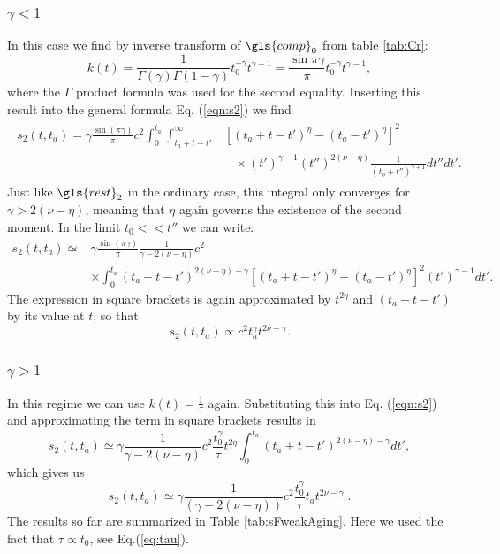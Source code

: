 \subsubsection{$\gamma<1$}
In this case we find by inverse transform of $\gls{comp}_0$ from table \ref{tab:Cr}:
\begin{equation}
 k(t) = \frac{1}{\Gamma(\gamma) \Gamma(1-\gamma)} t_0^{-\gamma} t^{\gamma-1} = \frac{\sin \pi \gamma}{\pi} t_0^{-\gamma} t^{\gamma-1} \label{eqn:kGammaSmall},
\end{equation}
%
where the $\Gamma$ product formula was used for the second equality. Inserting this result into the general formula Eq. (\ref{eqn:s2}) we find
\begin{align}
\begin{split}
s_2(t,t_a) = \gamma\frac{\sin(\pi \gamma)}{\pi}  c^2  \int_0^{t_a} \int^{\infty}_{t_a+t-t'} & [(t_a+t-t')^\eta-(t_a-t')^{\eta}]^2 \\
& \;\;\; \times   (t')^{\gamma-1}  (t'')^{2(\nu-\eta)} \frac{1}{(t_0+t'')^{\gamma+1}} dt'' dt' .
\end{split}
\end{align}
%
Just like $\gls{rest}_2$ in the ordinary case, this integral only converges for $\gamma>2(\nu-\eta)$, meaning that $\eta$ again governs the existence of the second moment. In the limit $t_0<< t''$ we can write:
\begin{align}
s_2(t,t_a) \simeq &  \gamma\frac{\sin(\pi \gamma)}{\pi} \frac{ 1 }{\gamma-2(\nu-\eta)} c^2 \\
&   \times \int_0^{t_a} (t_a+t-t')^{2(\nu-\eta)-\gamma} [(t_a+t-t')^\eta-(t_a-t')^{\eta}]^2 (t')^{\gamma-1}  dt' \nonumber .
\end{align}
The expression in square brackets is again approximated by $t^{2\eta}$ and $(t_a+t-t')$ by its value at $t$, so that
\begin{equation}
 s_2(t,t_a) \propto c^2 t_a^\gamma t^{2\nu -\gamma}. 
\end{equation}

\subsubsection{$\gamma>1$}
In this regime we can use $k(t)=\frac{1}{\tau}$ again. Substituting this into Eq. (\ref{eqn:s2}) and  approximating the term in square brackets results in
%
\begin{equation}
s_2(t,t_a) \simeq \gamma \frac{1}{\gamma-2(\nu-\eta)}c^2 \frac{t_0^{\gamma}}{\tau} t^{2\eta} \int_{0}^{t_a} (t_a+t-t')^{2(\nu-\eta)-\gamma} dt'  ,
\end{equation}
%
which gives us
%
\begin{equation}
s_2(t,t_a) \simeq \gamma \frac{1}{(\gamma-2(\nu-\eta))} c^2\frac{t_0^{\gamma}}{\tau} t_a t^{2\nu-\gamma} \; .
\end{equation}
The results so far are summarized in Table \ref{tab:sFweakAging}. Here we used the fact that $\tau \propto t_0$, see Eq.(\ref{eq:tau}). 


